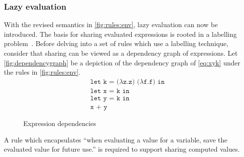 \subsubsection{Lazy evaluation}
With the revised semantics in \autoref{fig:rules:env}, lazy evaluation can now be introduced.
The basis for sharing evaluated expressions is rooted in a labelling problem~\cite{levy1988sharing}.
Before delving into a set of rules which use a labelling technique, consider that sharing can be viewed as a dependency graph of expressions.
Let \autoref{fig:dependencygraph} be a depiction of the dependency graph of \autoref{eq:xyk} under the rules in \autoref{fig:rules:env}.
\begin{align}
  &\texttt{let k = ($\lambda$z.z) ($\lambda$f.f) in }\label{eq:xyk}\\
  &\texttt{let x = k in }\tag*{}\\
  &\texttt{let y = k in }\tag*{}\\
  &\texttt{x + y}\tag*{}
\end{align}
\begin{figure}[ht]
  \centering
  \caption{Expression dependencies}
  \label{fig:dependencygraph}
\end{figure}
A rule which encapsulates ``when evaluating a value for a variable, save the evaluated value for future use.'' is required to support sharing computed values.
